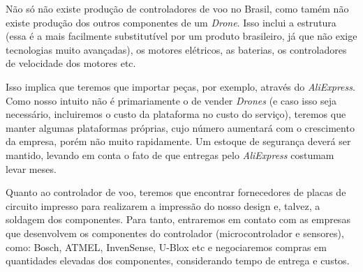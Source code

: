 Não só não existe produção de controladores de voo no Brasil, como tamém não existe produção dos outros componentes de um \emph{Drone}. Isso inclui a estrutura (essa é a mais facilmente substitutível por um produto brasileiro, já que não exige tecnologias muito avançadas), os motores elétricos, as baterias, os controladores de velocidade dos motores etc.

Isso implica que teremos que importar peças, por exemplo, através do \emph{AliExpress}. Como nosso intuito não é primariamente o de vender \emph{Drones} (e caso isso seja necessário, incluiremos o custo da plataforma no custo do serviço), teremos que manter algumas plataformas próprias, cujo número aumentará com o crescimento da empresa, porém não muito rapidamente. Um estoque de segurança deverá ser mantido, levando em conta o fato de que entregas pelo \emph{AliExpress} costumam levar meses.

Quanto ao controlador de voo, teremos que encontrar fornecedores de placas de circuito impresso para realizarem a impressão do nosso design e, talvez, a soldagem dos componentes. Para tanto, entraremos em contato com as empresas que desenvolvem os componentes do controlador (microcontrolador e sensores), como: Bosch, ATMEL, InvenSense, U-Blox etc e negociaremos compras em quantidades elevadas dos componentes, considerando tempo de entrega e custos.